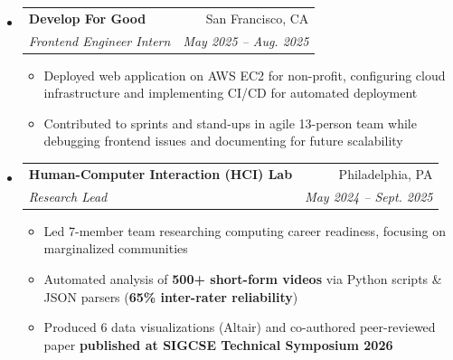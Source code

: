 \documentclass[letterpaper,10pt]{article}
\makeatletter
\newcommand{\rsection}[1]{
  \section{#1}
}
\newenvironment{rsectionlist}{
  \begin{itemize}[leftmargin=*, itemsep=0.75em, label={}]
}{
  \end{itemize}
  \vspace*{-1.5em}

}
\newcommand{\rsectionitem}[4]{
  \item \begin{tabular*}{0.98\textwidth}[t]{l@{\extracolsep{\fill}}r}
      \textbf{#1} & #2 \\
      \textit{#3} & \textit{\small #4}
    \end{tabular*}
}
\newcommand{\rsectiondesc}[1]{
  \begin{minipage}{0.98\textwidth} #1 \end{minipage}
  \vspace*{-0.25em}
}
\newenvironment{rpointlist}{
  \begin{itemize}
  \setlength{\itemsep}{0pt}
  \setlength{\parskip}{2pt}
  \setlength{\parsep}{0pt}
}{
  \end{itemize}
}
\newcommand{\rpointlone}[1]{
  \item \small{#1}
}
\newcommand{\highlight}[1]{\textbf{\small #1}}
\makeatother
\begin{document}
\begin{rsectionlist}
    \rsectionitem
      {Develop For Good}
      {San Francisco, CA}
      {Frontend Engineer Intern}
      {May 2025 -- Aug. 2025}
      \begin{rpointlist}
          \rpointlone{Deployed web application on AWS EC2 for non-profit, configuring cloud infrastructure and implementing CI/CD for automated deployment}
        \rpointlone{Contributed to sprints and stand-ups in agile 13-person team while debugging frontend issues and documenting for future scalability}
      \end{rpointlist}

    
      
    \rsectionitem
      {Human-Computer Interaction (HCI) Lab}
      {Philadelphia, PA}
      {Research Lead}
      {May 2024 -- Sept. 2025}
      \begin{rpointlist}
          \rpointlone{Led 7-member team researching computing career readiness, focusing on marginalized communities}
          \rpointlone{Automated analysis of \highlight{500+ short-form videos} via Python scripts \& JSON parsers (\highlight{65\% inter-rater reliability})}
          \rpointlone{Produced 6 data visualizations (Altair) and co-authored peer-reviewed paper \highlight{published at SIGCSE Technical Symposium 2026}}
      \end{rpointlist}
        
  \end{rsectionlist}



    
\end{document}
